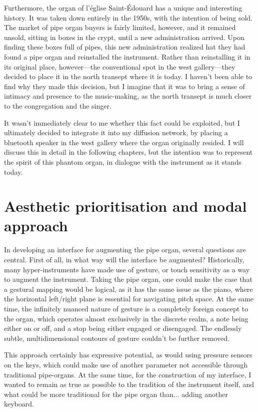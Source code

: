 \documentclass[12pt,twoside,maitrise]{dms_ks}
\theoremstyle{definition}
\begin{document}
{Furthermore, the organ of l'église Saint-Édouard has a unique and interesting history. 
It was taken down entirely in the 1950s, with the intention of being sold. 
The market of pipe organ buyers is fairly limited, however, and it remained unsold, sitting in boxes in the crypt, until a new administration arrived. 
Upon finding these boxes full of pipes, this new administration realized hat they had found a pipe organ and reinstalled the instrument. 
Rather than reinstalling it in its original place, however---the conventional spot in the west gallery---they decided to place it in the north transept where it is today. 
I haven't been able to find why they made this decision, but I imagine that it was to bring a sense of intimacy and presence to the music-making, as the north transept is much closer to the congregation and the singer. 

It wasn't immediately clear to me whether this fact could be exploited, but I ultimately decided to integrate it into my diffusion network, by placing a bluetooth speaker in the west gallery where the organ originally resided. 
I will discuss this in detail in the following chapters, but the intention was to represent the spirit of this phantom organ, in dialogue with the instrument as it stands today.

\section{Aesthetic prioritisation and modal approach}

In developing an interface for augmenting the pipe organ, several questions are central.
First of all, in what way will the interface be augmented?
Historically, many hyper-instruments have made use of gesture, or touch sensitivity as a way to augment the instrument.
Taking the pipe organ, one could make the case that a gestural mapping would be logical, as it has the same issue as the piano, where the horizontal left/right plane is essential for navigating pitch space.
At the same time, the infinitely nuanced nature of gesture is a completely foreign concept to the organ, which operates almost exclusively in the discrete realm, a note being either on or off, and a stop being either engaged or disengaged.
The endlessly subtle, multidimensional contours of gesture couldn't be further removed.

This approach certainly has expressive potential, as would using pressure sensors on the keys, which could make use of another parameter not accessible through traditional pipe-organs.
At the same time, for the construction of my interface, I wanted to remain as true as possible to the tradition of the instrument itself, and what could be more traditional for the pipe organ than... adding another keyboard.

}
\end{document}

